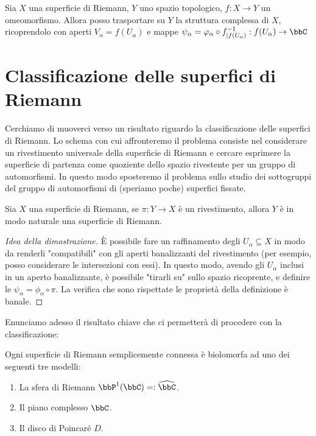 \begin{osservazione}
Sia $X$ una superficie di Riemann, $Y$ uno spazio topologico, $f:X\rightarrow Y$ un omeomorfismo. Allora posso trasportare su $Y$ la struttura complessa di $X$, ricoprendolo con aperti $V_\alpha=f(U_\alpha)$ e mappe $\psi_\alpha=\varphi_\alpha \circ f^{-1}_{|f(U_\alpha)}:f(U_\alpha)\rightarrow\bbC$
\end{osservazione}


\section{Classificazione delle superfici di Riemann}
Cerchiamo di muoverci verso un risultato riguardo la classificazione delle superfici di Riemann. Lo schema con cui affronteremo il problema consiste nel considerare un rivestimento universale della superficie di Riemann e cercare esprimere la superficie di partenza come quoziente dello spazio rivestente per un gruppo di automorfismi. In questo modo sposteremo il problema sullo studio dei sottogruppi del gruppo di automorfismi di (speriamo poche) superfici fissate.
\begin{osservazione}
Sia $X$ una superficie di Riemann, se $\pi:Y\rightarrow X$ è un rivestimento, allora $Y$ è in modo naturale una superficie di Riemann.
\end{osservazione}
\begin{proof}[Idea della dimostrazione]
È possibile fare un raffinamento degli $U_\alpha\subseteq X$ in modo da renderli "compatibili" con gli aperti banalizzanti del rivestimento (per esempio, posso considerare le intersezioni con essi). In questo modo, avendo gli $U_\alpha$ inclusi in un aperto banalizzante, è possibile "tirarli su" sullo spazio ricoprente, e definire le $\psi_\alpha=\phi_\alpha \circ \pi$. La verifica che sono rispettate le proprietà della definizione è banale.
\end{proof}
Enunciamo adesso il risultato chiave che ci permetterà di procedere con la classificazione:
\begin{teorema}[di Riemann]
Ogni superficie di Riemann semplicemente connessa è biolomorfa ad uno dei seguenti tre modelli:
\begin{enumerate}
  \item La sfera di Riemann $\bbP^1(\bbC)=:\widehat{\bbC}$.
  \item Il piano complesso $\bbC$.
  \item Il disco di Poincaré $D$.
\end{enumerate}
\end{teorema}

